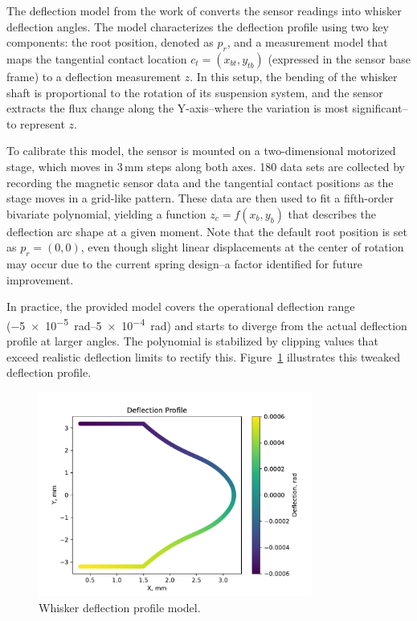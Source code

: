 The deflection model from the work of \textcite{dang2025whisker} converts the sensor readings into whisker deflection angles.
The model characterizes the deflection profile using two key components: the root position, denoted as \(p_r\), and a measurement model that maps the tangential contact location \(c_t = (x_{bt}, y_{tb})\) (expressed in the sensor base frame) to a deflection measurement \(z\).
In this setup, the bending of the whisker shaft is proportional to the rotation of its suspension system, and the sensor extracts the flux change along the Y-axis--where the variation is most significant--to represent \(z\).

To calibrate this model, the sensor is mounted on a two-dimensional motorized stage, which moves in 3\,mm steps along both axes.
180 data sets are collected by recording the magnetic sensor data and the tangential contact positions as the stage moves in a grid-like pattern.
These data are then used to fit a fifth-order bivariate polynomial, yielding a function \(z_c = f(x_b, y_b)\) that describes the deflection arc shape at a given moment.
Note that the default root position is set as \(p_r = (0,0)\), even though slight linear displacements at the center of rotation may occur due to the current spring design--a factor identified for future improvement.

In practice, the provided model covers the operational deflection range (\qtyrange{-5e-5}{5e-4}{\radian}) and starts to diverge from the actual deflection profile at larger angles.
The polynomial is stabilized by clipping values that exceed realistic deflection limits to rectify this.
Figure~\ref{fig:deflection_profile} illustrates this tweaked deflection profile.

\begin{figure}[htb]
    \centering
    \includegraphics[width=0.8\textwidth]{figures/deflection_profile}
    \caption{Whisker deflection profile model.}
    \label{fig:deflection_profile}
\end{figure}

